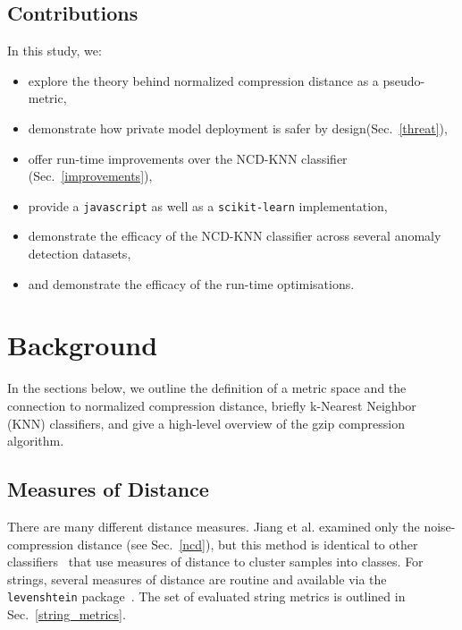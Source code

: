 \documentclass[conference]{IEEEtran}
\begin{document}
\subsection{Contributions}
In this study, we:

\begin{itemize}
    \item explore the theory behind normalized compression distance as a pseudo-metric,
    \item demonstrate how private model deployment is safer by design(Sec.~\ref{threat}),
    \item offer run-time improvements over the NCD-KNN classifier (Sec.~\ref{improvements}),
    \item provide a \texttt{javascript} as well as a \texttt{scikit-learn} implementation,
    \item demonstrate the efficacy of the NCD-KNN classifier across several anomaly detection datasets,
    \item and demonstrate the efficacy of the run-time optimisations.
\end{itemize}





\section{Background}

In the sections below, we outline the definition of a metric space and the connection to normalized compression distance, briefly k-Nearest Neighbor (KNN) classifiers, and give a high-level overview of the gzip compression algorithm.

\subsection{Measures of Distance}
There are many different distance measures. Jiang et al. examined only the noise-compression distance (see Sec.~\ref{ncd}), but this method is identical to other classifiers~\cite{vapnik1994measuring} that use measures of distance to cluster samples into classes. For strings, several measures of distance are routine and available via the \texttt{levenshtein} package~\cite{levenshtein}. The set of evaluated string metrics is outlined in Sec.~\ref{string_metrics}.
\end{document}
